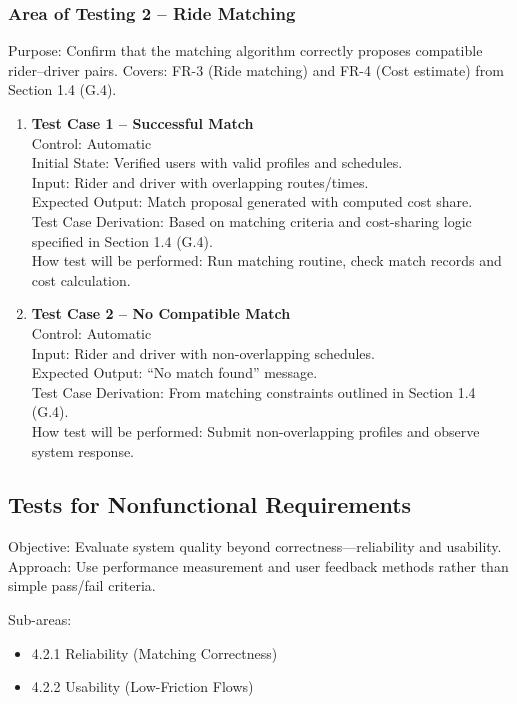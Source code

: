 \documentclass[12pt, titlepage]{article}
\begin{document}
\subsubsection{Area of Testing 2 – Ride Matching}

Purpose: Confirm that the matching algorithm correctly proposes compatible rider–driver pairs.  
Covers: FR-3 (Ride matching) and FR-4 (Cost estimate) from Section 1.4 (G.4).

\begin{enumerate}
\item \textbf{Test Case 1 – Successful Match}\\
Control: Automatic\\
Initial State: Verified users with valid profiles and schedules.\\
Input: Rider and driver with overlapping routes/times.\\
Expected Output: Match proposal generated with computed cost share.\\
Test Case Derivation: Based on matching criteria and cost-sharing logic specified in Section 1.4 (G.4).\\
How test will be performed: Run matching routine, check match records and cost calculation.\\[5pt]

\item \textbf{Test Case 2 – No Compatible Match}\\
Control: Automatic\\
Input: Rider and driver with non-overlapping schedules.\\
Expected Output: “No match found” message.\\
Test Case Derivation: From matching constraints outlined in Section 1.4 (G.4).\\
How test will be performed: Submit non-overlapping profiles and observe system response.\\
\end{enumerate}

\subsection{Tests for Nonfunctional Requirements}

Objective: Evaluate system quality beyond correctness—reliability and usability.  
Approach: Use performance measurement and user feedback methods rather than simple pass/fail criteria.

Sub-areas:
\begin{itemize}
    \item 4.2.1 Reliability (Matching Correctness)
    \item 4.2.2 Usability (Low-Friction Flows)
\end{itemize}
\end{document}
